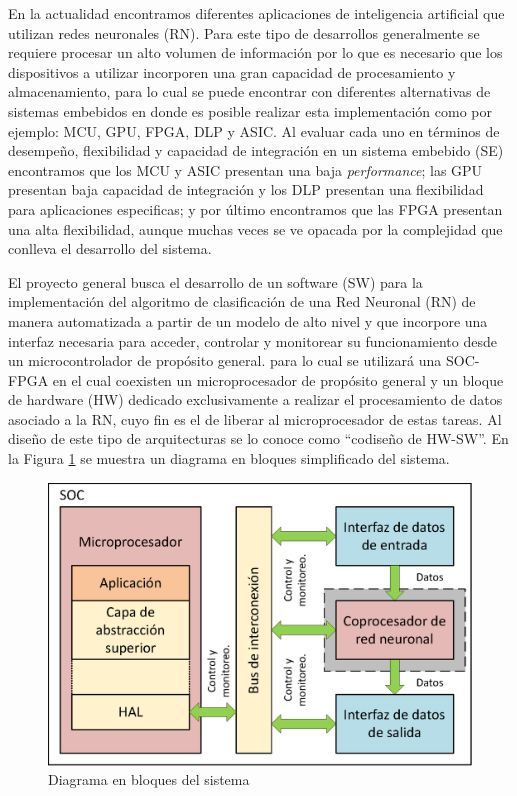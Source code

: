 \documentclass[11pt]{charter}
\begin{document}
En la actualidad encontramos diferentes aplicaciones de inteligencia artificial que utilizan redes neuronales (RN). Para este tipo de desarrollos generalmente se requiere procesar un alto volumen de información por lo que es necesario que los dispositivos a utilizar incorporen una gran capacidad de procesamiento y almacenamiento, para lo cual se puede encontrar con diferentes alternativas de sistemas embebidos en donde es posible realizar esta implementación como por ejemplo: MCU, GPU, FPGA, DLP y ASIC. Al evaluar cada uno en términos de desempeño, flexibilidad y capacidad de integración en un sistema embebido (SE) encontramos que los MCU y ASIC presentan una baja \textit{performance}; las GPU presentan baja capacidad de integración y los DLP presentan una flexibilidad para aplicaciones especificas; y por último encontramos que las FPGA presentan una alta flexibilidad, aunque muchas veces se ve opacada por la complejidad que conlleva el desarrollo del sistema. 

El proyecto general busca el desarrollo de un software (SW) para la implementación del algoritmo de clasificación de una Red Neuronal (RN) de manera automatizada a partir de un modelo de alto nivel  y que incorpore una interfaz necesaria para acceder, controlar y monitorear su funcionamiento desde un microcontrolador de propósito general. para lo cual se utilizará una SOC-FPGA en el cual coexisten un microprocesador de propósito general y un bloque de hardware (HW) dedicado exclusivamente a realizar el procesamiento de datos asociado a la RN, cuyo fin es el de liberar al microprocesador de estas tareas. Al diseño de este tipo de arquitecturas se lo conoce como “codiseño de HW-SW”. En la Figura \ref{fig:diagBloques} se muestra un diagrama en bloques simplificado del sistema.          

\vspace{25px}

\begin{figure}[htpb]
\centering 
\includegraphics[width=.7\textwidth]{./Figuras/Diagramas.eps}
\caption{Diagrama en bloques del sistema}
\label{fig:diagBloques}
\end{figure}
\end{document}
